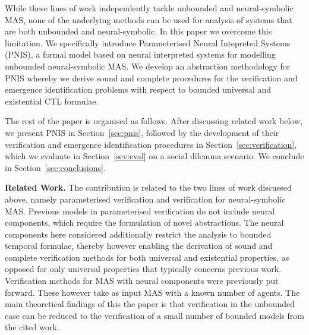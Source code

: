 While these lines of work independently tackle unbounded and neural-symbolic
MAS, none of the underlying methods can be used for analysis of systems that are
both unbounded and neural-symbolic.  In this paper we overcome this limitation.
We specifically introduce Parameterised Neural Intepreted Systems (PNIS), a
formal model based on neural interpreted systems for modelling unbounded
neural-symbolic MAS.  We develop an abstraction methodology for PNIS whereby we
derive sound and complete procedures for the verification and emergence
identification problems with respect to  bounded universal and existential CTL
formulae. 


The rest of the paper is organised as follows. After discussing related work
below, we present PNIS in Section~\ref{sec:pnis}, followed by the development of
their verification and emergence identification procedures in
Section~\ref{sec:verification}, which we evaluate in Section~\ref{sev:eval}  on a social
dilemma scenario. We conclude in Section~\ref{sec:conclusions}.


{\bf Related Work.}  The contribution is related to the two lines of work
discussed above, namely parameterised verification and verification for
neural-symbolic MAS. Previous models in parameterised verification do not
include neural components, which require the formulation of novel abstractions.
The neural components here considered additionally restrict the analysis to
bounded temporal formulae, thereby however enabling the derivation of sound and
complete verification methods for both universal and existential properties, as
opposed for only universal properties that typically concerns previous work.
Verification methods for MAS with neural components were previously put forward.
These however take as input MAS with a known number of agents. The main
theoretical findings of this  the paper is that verification in the unbounded
case can be reduced to the verification of a small number of bounded models from
the cited work.



